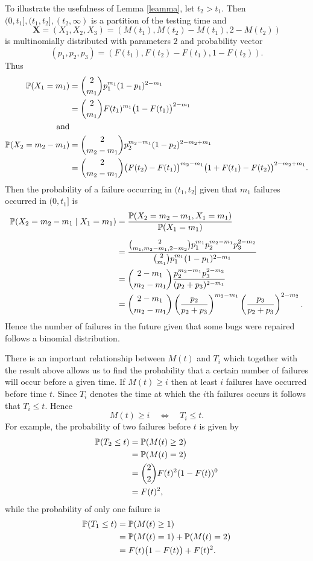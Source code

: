 To illustrate the usefulness of Lemma \ref{leamma}, let $t_2>t_1$. Then $(0,t_1],(t_1,t_2], (t_2,\infty)$ is a partition of the testing time and 
$$\mathbf{X} = (X_1,X_2, X_3)=(M(t_1), M(t_2)-M(t_1), 2-M(t_2))$$
is multinomially distributed with parameters $2$ and probability vector 
$$(p_1, p_2, p_3)=(F(t_1), F(t_2)-F(t_1), 1-F(t_2)).$$ 
Thus
\begin{align*}
    \mathbb{P}(X_1=m_1)&={2\choose m_1}p_1^{m_1}(1-p_1)^{2-m_1}\\
    &={2\choose m_1}F(t_1)^{m_1}\big(1-F(t_1)\big)^{2-m_1}\\
    \text{and}\\
    \mathbb{P}(X_2=m_2-m_1)&={2\choose m_2-m_1}p_2^{m_2-m_1}(1-p_2)^{2-m_2+m_1}\\
    &={2\choose m_2-m_1}\big(F(t_2)-F(t_1)\big)^{m_2-m_1}\big(1+F(t_1)-F(t_2)\big)^{2-m_2+m_1}.
\end{align*}
Then the probability of a failure occurring in $(t_1,t_2]$ given that $m_1$ failures occurred in $(0,t_1]$ is
\begin{equation}\label{eq:bugs-cond-dist}
    \begin{aligned}
    \mathbb{P}(X_2=m_2-m_1\mid X_1=m_1)&=\frac{\mathbb{P}(X_2=m_2-m_1,X_1=m_1)}{\mathbb{P}(X_1=m_1)}\\[0.5 em]
    &=\frac{{2\choose m_1, m_2-m_1, 2-m_2}p_1^{m_1}p_2^{m_2-m_1}p_3^{2-m_2}}{{2\choose m_1}p_1^{m_1}(1-p_1)^{2-m_1}}\\
    &={2-m_1\choose m_2-m_1}\frac{p_2^{m_2-m_1}p_3^{2-m_2}}{(p_2+p_3)^{2-m_1}}\\
    &={2-m_1\choose m_2-m_1}\left(\frac{p_2}{p_2+p_3}\right)^{m_2-m_1}\left(\frac{p_3}{p_2+p_3}\right)^{2-m_2}.
\end{aligned}
\end{equation}
Hence the number of failures in the future given that some bugs were repaired follows a binomial distribution.

There is an important relationship between $M(t)$ and $T_i$ which together with the result above allows us to find the probability that a certain number of failures will occur before a given time. If $M(t)\geq i$ then at least $i$ failures have occurred before time $t$. Since $T_i$ denotes the time at which the $i$th failures occurs it follows that $T_i\leq t$. Hence
\begin{equation*}
    M(t)\geq i\quad\iff\quad T_i\leq t.
\end{equation*}
For example, the probability of two failures before $t$ is given by
\begin{align*}
    \mathbb{P}(T_2\leq t)&=\mathbb{P}(M(t)\geq 2)\\
    &=\mathbb{P}(M(t)=2)\\
    &={2\choose 2}F(t)^2(1-F(t))^0\\
    &=F(t)^2,
\end{align*}
while the probability of only one failure is
\begin{align*}
    \mathbb{P}(T_1\leq t)&=\mathbb{P}(M(t)\geq 1)\\
    &=\mathbb{P}(M(t)=1)+\mathbb{P}(M(t)=2)\\
    &=F(t)\big(1-F(t)\big)+F(t)^2.
\end{align*}

